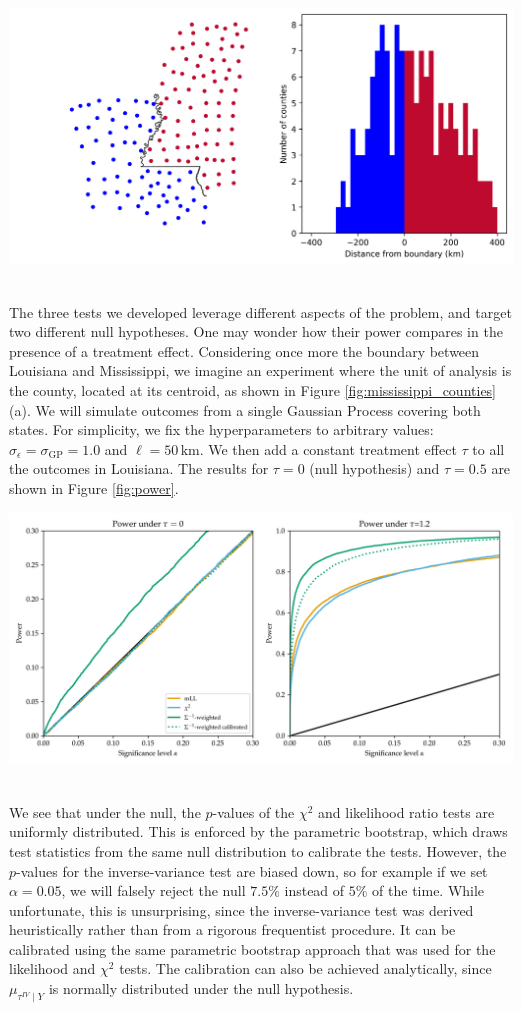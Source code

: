 \documentclass[letter]{article}
\makeatletter
\def\maxwidth{\ifdim\Gin@nat@width>\linewidth\linewidth
    \else\Gin@nat@width\fi}
\let\Oldincludegraphics\includegraphics
\renewcommand{\includegraphics}[1]{\Oldincludegraphics[width=.8\maxwidth]{#1}}
\newcommand{\sigmaf}{\sigma_{\mathrm{GP}}}
\newcommand{\sigman}{\sigma_{\epsilon}}
\newcommand{\invvar}{\tau^{IV}}
\makeatother
\begin{document}
\includegraphics{figures/mississippi_counties.png}
\(\label{fig:mississippi_counties}\)

The three tests we developed leverage different aspects of the problem,
and target two different null hypotheses. One may wonder how their power
compares in the presence of a treatment effect. Considering once more
the boundary between Louisiana and Mississippi, we imagine an experiment
where the unit of analysis is the county, located at its centroid, as
shown in Figure \ref{fig:mississippi_counties}(a). We will simulate
outcomes from a single Gaussian Process covering both states. For
simplicity, we fix the hyperparameters to arbitrary values:
\(\sigman=\sigmaf=1.0\) and \(\ell=50\,\mathrm{km}\). We then add a
constant treatment effect \(\tau\) to all the outcomes in Louisiana. The
results for \(\tau=0\) (null hypothesis) and \(\tau=0.5\) are shown in
Figure \ref{fig:power}.

\includegraphics{figures/power_HT.png} \(\label{fig:power}\)

We see that under the null, the \(p\)-values of the \(\chi^2\) and
likelihood ratio tests are uniformly distributed. This is enforced by
the parametric bootstrap, which draws test statistics from the same null
distribution to calibrate the tests. However, the \(p\)-values for the
inverse-variance test are biased down, so for example if we set
\(\alpha=0.05\), we will falsely reject the null \(7.5\%\) instead of
\(5\%\) of the time. While unfortunate, this is unsurprising, since the
inverse-variance test was derived heuristically rather than from a
rigorous frequentist procedure. It can be calibrated using the same
parametric bootstrap approach that was used for the likelihood and
\(\chi^2\) tests. The calibration can also be achieved analytically,
since \(\mu_{\invvar \mid Y}\) is normally distributed under the null
hypothesis.
\end{document}
